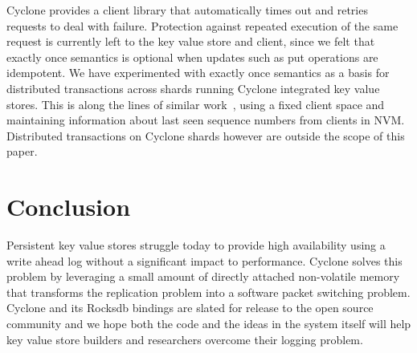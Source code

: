 \documentclass[pageno]{jpaper}
\begin{document}
Cyclone provides a client library that automatically times out and retries
requests to deal with failure. Protection against repeated execution of the same
request is currently left to the key value store and client, since we felt that
exactly once semantics is optional when updates such as put operations are
idempotent. We have experimented with exactly once semantics as a basis for
distributed transactions across shards running Cyclone integrated key value
stores. This is along the lines of similar work~\cite{raft_lin}, using a fixed
client space and maintaining information about last seen sequence numbers from
clients in NVM. Distributed transactions on Cyclone shards however are outside
the scope of this paper.

\section{Conclusion}
Persistent key value stores struggle today to provide high availability using a
write ahead log without a significant impact to performance. Cyclone solves this
problem by leveraging a small amount of directly attached non-volatile memory
that transforms the replication problem into a software packet switching
problem. Cyclone and its Rocksdb bindings are slated for release to the open
source community and we hope both the code and the ideas in the system itself
will help key value store builders and researchers overcome their logging
problem.
\newcommand\myurl[2]{\url{#1}}


\end{document}
